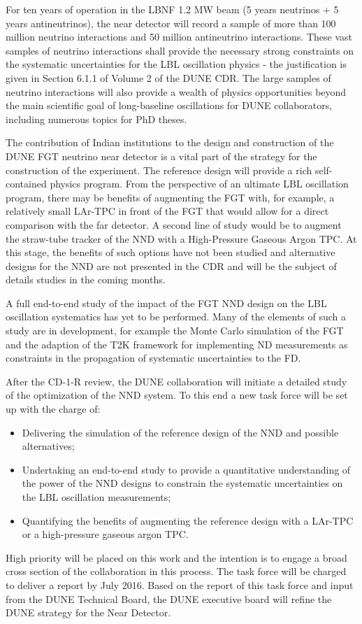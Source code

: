 For ten years of operation in the LBNF 1.2 MW beam (5 years neutrinos + 5 years 
antineutrinos), the near detector will record a sample of more than 100 million 
neutrino interactions and 50 million antineutrino interactions. These vast samples 
of neutrino interactions shall provide the necessary strong constraints on the 
systematic uncertainties for the LBL oscillation physics - the justification is 
given in Section 6.1.1 of Volume 2 of the DUNE CDR. The large samples of neutrino 
interactions will also provide a wealth of physics opportunities beyond the main 
scientific goal of long-baseline oscillations for DUNE collaborators, including 
numerous topics for PhD theses.  

The contribution of Indian institutions to the design and construction of the DUNE 
FGT neutrino near detector is a vital part of the strategy for the construction 
of the experiment. The reference design will provide a rich self-contained physics 
program. From the perspective of an ultimate LBL oscillation program, there may 
be benefits of augmenting the FGT with, for example, a relatively small LAr-TPC 
in front of the FGT that would allow for a direct comparison with the far detector. 
A second line of study would be to augment the straw-tube tracker of the NND with 
a High-Pressure Gaseous Argon TPC. At this stage, the benefits of such options 
have not been studied and alternative designs for the NND are not presented in 
the CDR and will be the subject of details studies in the coming months. 

A full end-to-end study of the impact of the FGT NND design on the LBL oscillation 
systematics has yet to be performed. Many of the elements of such a study are in 
development, for example the Monte Carlo simulation of the FGT and the adaption 
of the T2K framework for implementing ND measurements as constraints in the propagation 
of systematic uncertainties to the FD. 

After the CD-1-R review, the DUNE collaboration will initiate a detailed study 
of the optimization of the NND system. To this end a new task force will be set 
up with the charge of:

\begin{itemize}
\item Delivering the simulation of the reference design of the NND and possible alternatives;

\item Undertaking an end-to-end study to provide a quantitative understanding of 
the power of the NND designs to constrain the systematic uncertainties on the LBL 
oscillation measurements;

\item Quantifying the benefits of augmenting the reference design with a LAr-TPC 
or a high-pressure gaseous argon TPC.
\end{itemize}

High priority will be placed on this work and the intention is to engage a broad 
cross section of the collaboration in this process. The task force will be charged 
to deliver a report by July 2016. Based on the report of this task force and input 
from the DUNE Technical Board, the DUNE executive board will refine the DUNE strategy 
for the Near Detector.
